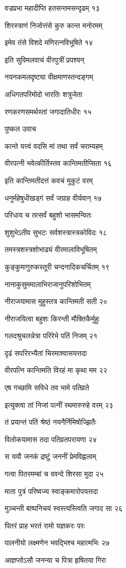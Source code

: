 वज्रप्रभा महादीप्ति हतसन्तमसन्दृढम् १३

शिरस्त्राणं निजोत्तंसे कुरु कान्त मनोरमम्

इमेव तंसे विशदे मणिरत्नविभूषिते १४

इति सुविमलवाचं वीरपुत्रीं प्रपश्यन्

नयनकमलदृष्ट्या वीक्षमाणस्तन्दङ्गम्

अधिगतपरिमोदो भारतिः शत्रुजेता

रणकरणसमर्थस्तां जगादातिधीरः १५

पुष्कल उवाच

कान्ते यत्त्वं वदसि मां तथा सर्वं चराम्यहम्

वीरपत्नी भवेत्कीर्तिस्तव कान्तिमतीप्सिता १६

इति कान्तिमतीदत्तं कवचं मुकुटं वरम्

धनुर्महेषुधीखड्गं सर्वं जग्राह वीर्यवान् १७

परिधाय च तत्सर्वं बहुशो भासमन्वितः

शुशुभेऽतीव सुभटः सर्वशस्त्रास्त्रकोविदः १८

तमस्त्रशस्त्रशोभाढ्यं वीरमालाविभूषितम्

कुङ्कुमागुरुकस्तूरी चन्दनादिकचर्चितम् १९

नानाकुसुममालाभिराजानुपरिशोभितम्

नीराजयामास मुहुस्तत्र कान्तिमती सती २०

नीराजयित्वा बहुशः किरन्ती मौक्तिकैर्मुहुः

गलदश्रुचलन्नेत्रा परिरेभे पतिं निजम् २१

दृढं सपरिरभ्यैतां चिरमाश्वासयत्तदा

वीरपत्नि कान्तिमति विरहं मा कृथा मम २२

एष गच्छामि सविधे तव भामे पतिव्रते

इत्युक्त्वा तां निजां पत्नीं रथमारुरुहे वरम् २३

तं प्रयान्तं पतिं श्रेष्ठं नयनैर्निमिषोज्झितैः

विलोकयामास तदा पतिव्रतपरायणा २४

स ययौ जनकं द्रष्टुं जननीं प्रेमविह्वलाम्

गत्वा पितरमम्बां च ववन्दे शिरसा मुदा २५

माता पुत्रं परिष्वज्य स्वाङ्कमारोपयत्तदा

मुञ्चन्ती बाष्पनिचयं स्वस्त्यस्त्विति जगाद सा २६

पितरं प्राह भरतं रामो यज्ञकरः परः

पालनीयो लक्ष्मणेन भवद्भिश्च महात्मभिः २७

आज्ञप्तोऽसौ जनन्या च पित्रा हृषितया गिरा

